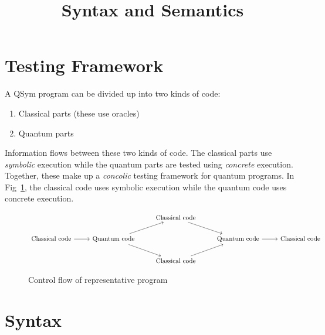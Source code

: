 \documentclass[runningheads]{llncs}
\begin{document}
\title{Syntax and Semantics}
\author{}
\institute{}
\maketitle

\section{Testing Framework}

A QSym program can be divided up into two kinds of code:

\begin{enumerate}
  \item Classical parts (these use oracles)
  \item Quantum parts
\end{enumerate}

Information flows between these two kinds of code. The classical parts use \textit{symbolic} execution while the quantum parts are tested using \textit{concrete} execution. Together, these make up a \textit{concolic} testing framework for quantum programs. In Fig~\ref{fig:control-flow}, the classical code uses symbolic execution while the quantum code uses concrete execution.

\begin{figure}
\[\begin{tikzcd}
	&& {\textnormal{Classical code}} \\
	{\textnormal{Classical code}} & {\textnormal{Quantum code}} && {\textnormal{Quantum code}} & {\textnormal{Classical code}} \\
	&& {\textnormal{Classical code}}
	\arrow[from=1-3, to=2-4]
	\arrow[from=2-1, to=2-2]
	\arrow[from=2-2, to=1-3]
	\arrow[from=2-2, to=3-3]
	\arrow[from=2-4, to=2-5]
	\arrow[from=3-3, to=2-4]
\end{tikzcd}\]
  \caption{Control flow of representative program}
  \label{fig:control-flow}
\end{figure}

\section{Syntax}
\end{document}
